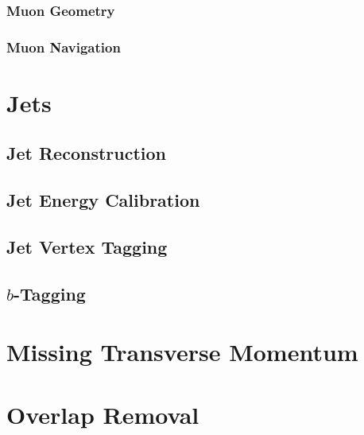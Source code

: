 \documentclass{umassthesis}          %
\begin{document}
\subsubsection{Muon Geometry}\label{sec:reco_muon_geometry}

\subsubsection{Muon Navigation}\label{sec:reco_muon_nav}


\section{Jets}\label{sec:reco_jets}

\subsection{Jet Reconstruction}\label{sec:reco_pflow}

\subsection{Jet Energy Calibration}\label{sec:reco_jet_calibration}

\subsection{Jet Vertex Tagging}\label{sec:reco_jvt_fjvt}

\subsection{$b$-Tagging}\label{sec:reco_btagging}


\section{Missing Transverse Momentum}\label{sec:reco_met}

\section{Overlap Removal}\label{sec:reco_overlap_removal}


% 
\end{document}
